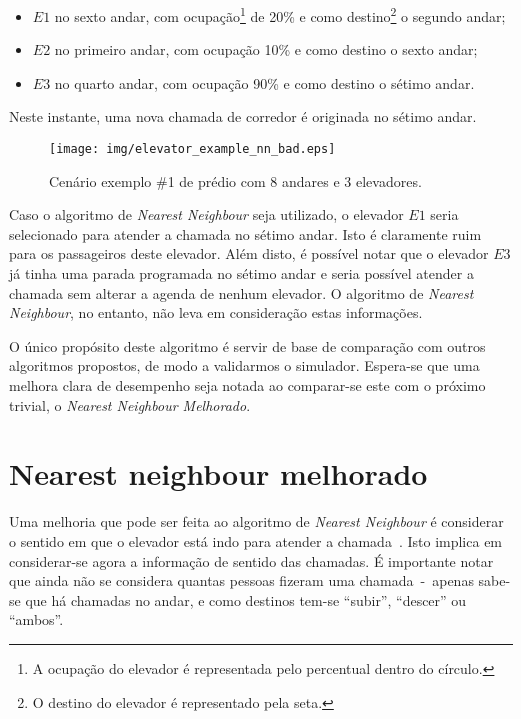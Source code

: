 \begin{itemize}\setlength\itemsep{0mm}
\item $E1$ no sexto andar, com ocupação\footnote{A ocupação do elevador é representada pelo percentual dentro do círculo.} de 20\% e como destino\footnote{O destino do elevador é representado pela seta.} o segundo andar;
\item $E2$ no primeiro andar, com ocupação 10\% e como destino o sexto andar;
\item $E3$ no quarto andar, com ocupação 90\% e como destino o sétimo andar.
\end{itemize}

Neste instante, uma nova chamada de corredor é originada no sétimo andar.

\begin{figure}[htb!]
  \centering
  \texttt{[image: img/elevator\_example\_nn\_bad.eps]}
  \caption{Cenário exemplo \#1 de prédio com 8 andares e 3 elevadores.}
\label{fig:elevadores:nn:bad}
\end{figure}

Caso o algoritmo de \textit{Nearest Neighbour} seja utilizado, o elevador $E1$
seria selecionado para atender a chamada no sétimo andar. Isto é claramente ruim
para os passageiros deste elevador. Além disto, é possível notar que o elevador
$E3$ já tinha uma parada programada no sétimo andar e seria possível atender a
chamada sem alterar a agenda de nenhum elevador. O algoritmo de \textit{Nearest
Neighbour}, no entanto, não leva em consideração estas informações.

O único propósito deste algoritmo é servir de base de comparação com outros
algoritmos propostos, de modo a validarmos o simulador. Espera-se que uma
melhora clara de desempenho seja notada ao comparar-se este com o próximo
trivial, o \textit{Nearest Neighbour Melhorado}.

\section{\label{sec:ai:nnm}Nearest neighbour melhorado}
Uma melhoria que pode ser feita ao algoritmo de \textit{Nearest Neighbour} é
considerar o sentido em que o elevador está indo para atender a
chamada~\cite{Friese20061908}. Isto implica em considerar-se agora a informação
de sentido das chamadas. É importante notar que ainda não se considera quantas
pessoas fizeram uma chamada~-~apenas sabe-se que há chamadas no andar, e como
destinos tem-se ``subir'', ``descer'' ou ``ambos''.


